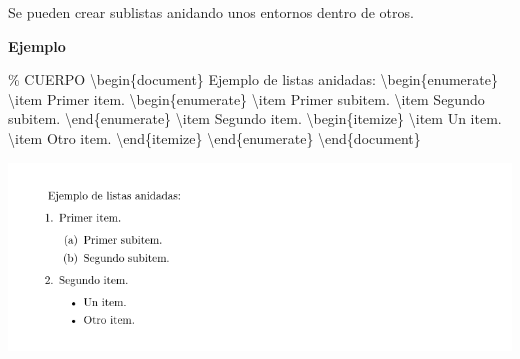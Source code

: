 \documentclass[
  a4paper,
]{scrreport}
\newenvironment{Shaded}{\begin{snugshade}}{\end{snugshade}}
\newcommand{\CommentTok}[1]{\textcolor[rgb]{0.37,0.37,0.37}{#1}}
\newcommand{\ExtensionTok}[1]{\textcolor[rgb]{0.00,0.23,0.31}{#1}}
\newcommand{\FunctionTok}[1]{\textcolor[rgb]{0.28,0.35,0.67}{#1}}
\newcommand{\KeywordTok}[1]{\textcolor[rgb]{0.00,0.23,0.31}{#1}}
\newcommand{\NormalTok}[1]{\textcolor[rgb]{0.00,0.23,0.31}{#1}}
\begin{document}
Se pueden crear sublistas anidando unos entornos dentro de otros.

\textbf{Ejemplo}

\begin{Shaded}
\begin{Highlighting}[]
\CommentTok{\% CUERPO}
\KeywordTok{\textbackslash{}begin}\NormalTok{\{}\ExtensionTok{document}\NormalTok{\}}
\NormalTok{Ejemplo de listas anidadas:}
\KeywordTok{\textbackslash{}begin}\NormalTok{\{}\ExtensionTok{enumerate}\NormalTok{\}}
\FunctionTok{\textbackslash{}item}\NormalTok{ Primer item.}
    \KeywordTok{\textbackslash{}begin}\NormalTok{\{}\ExtensionTok{enumerate}\NormalTok{\}}
    \FunctionTok{\textbackslash{}item}\NormalTok{ Primer subitem.}
    \FunctionTok{\textbackslash{}item}\NormalTok{ Segundo subitem.}
    \KeywordTok{\textbackslash{}end}\NormalTok{\{}\ExtensionTok{enumerate}\NormalTok{\}}
\FunctionTok{\textbackslash{}item}\NormalTok{ Segundo item.}
    \KeywordTok{\textbackslash{}begin}\NormalTok{\{}\ExtensionTok{itemize}\NormalTok{\}}
    \FunctionTok{\textbackslash{}item}\NormalTok{ Un item.}
    \FunctionTok{\textbackslash{}item}\NormalTok{ Otro item.}
    \KeywordTok{\textbackslash{}end}\NormalTok{\{}\ExtensionTok{itemize}\NormalTok{\}}
\KeywordTok{\textbackslash{}end}\NormalTok{\{}\ExtensionTok{enumerate}\NormalTok{\}}
\KeywordTok{\textbackslash{}end}\NormalTok{\{}\ExtensionTok{document}\NormalTok{\}}
\end{Highlighting}
\end{Shaded}

\begin{tcolorbox}[enhanced jigsaw, bottomrule=.15mm, leftrule=.75mm, opacityback=0, titlerule=0mm, bottomtitle=1mm, colbacktitle=quarto-callout-note-color!10!white, arc=.35mm, toprule=.15mm, colframe=quarto-callout-note-color-frame, title={Salida}, coltitle=black, colback=white, breakable, toptitle=1mm, rightrule=.15mm, left=2mm, opacitybacktitle=0.6]

\includegraphics{./img/listas/listas-anidadas.png}

\end{tcolorbox}
\end{document}
